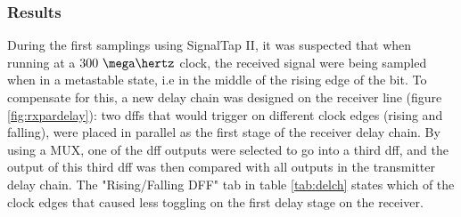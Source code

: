 \documentclass[main.tex]{subfiles}
\begin{document}
\subsubsection{Results}


During the first samplings using SignalTap II, it was suspected that when running at a $300~\mega\hertz$ clock, the received signal were being sampled when in a metastable state, i.e in the middle of the rising edge of the bit. To compensate for this, a new delay chain was designed on the receiver line (figure \ref{fig:rxpardelay}): two \glspl{dff} that would trigger on different clock edges (rising and falling), were placed in parallel as the first stage of the receiver delay chain. By using a MUX, one of the \gls{dff} outputs were selected to go into a third \gls{dff}, and the output of this third \gls{dff} was then compared with all outputs in the transmitter delay chain. The "Rising/Falling DFF" tab in table \ref{tab:delch} states which of the clock edges that caused less toggling on the first delay stage on the receiver. \\

\end{document}
